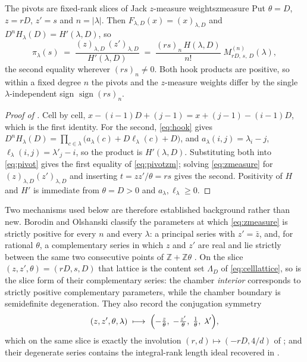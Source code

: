 \documentclass[11pt,letterpaper]{article}
\newcommand{\Zint}{\mathbb{Z}}
\begin{document}
\begin{proposition}{The pivots are fixed-rank slices of Jack \texorpdfstring{$z$}{z}-measure weights}{zmeasure}
Put $\theta=D$, $z=rD$, $z'=s$ and $n=|\lambda|$. Then
$F_{\lambda,D}(x)=(x)_{\lambda,D}$ and $D^{n}H_\lambda(D)=H'(\lambda,D)$, so
\begin{equation}
  \pi_\lambda(s)
  \;=\;\frac{(z)_{\lambda,D}\,(z')_{\lambda,D}}{H'(\lambda,D)}
  \;=\;\frac{(rs)_n\,H(\lambda,D)}{n!}\;M^{(n)}_{rD,\,s,\,D}(\lambda),
  \label{eq:pivotzm}
\end{equation}
the second equality wherever $(rs)_n\ne0$. Both hook products are positive, so
within a fixed degree $n$ the pivots and the $z$-measure weights differ by the
single $\lambda$-independent sign $\operatorname{sign}(rs)_n$.
\end{proposition}

\begin{proof}[Proof of ]
Cell by cell, $x-(i-1)D+(j-1)=x+(j-1)-(i-1)D$, which is the first identity. For
the second, \eqref{eq:hook} gives
$D^{n}H_\lambda(D)=\prod_{c\in\lambda}\bigl(a_\lambda(c)+D\ell_\lambda(c)+D\bigr)$,
and $a_\lambda(i,j)=\lambda_i-j$, $\ell_\lambda(i,j)=\lambda'_j-i$, so the
product is $H'(\lambda,D)$. Substituting both into \eqref{eq:pivot} gives the
first equality of \eqref{eq:pivotzm}; solving \eqref{eq:zmeasure} for
$(z)_{\lambda,D}(z')_{\lambda,D}$ and inserting $t=zz'/\theta=rs$ gives the
second. Positivity of $H$ and $H'$ is immediate from $\theta=D>0$ and
$a_\lambda,\ell_\lambda\ge0$.
\end{proof}

Two mechanisms used below are therefore established background rather than new.
Borodin and Olshanski classify the parameters at which \eqref{eq:zmeasure} is
strictly positive for every $n$ and every $\lambda$: a principal series with
$z'=\bar z$, and, for rational $\theta$, a complementary series in which $z$ and
$z'$ are real and lie strictly between the same two consecutive points of
$\Zint+\Zint\theta$ \cite[\S1]{BO}. On the slice $(z,z',\theta)=(rD,s,D)$ that
lattice is the content set $\Lambda_D$ of \eqref{eq:celllattice}, so
 is the slice form of their complementary series: the chamber
\emph{interior} corresponds to strictly positive complementary parameters, while
the chamber boundary is semidefinite degeneration. They also
record the conjugation symmetry
\begin{equation}
  (z,z',\theta,\lambda)\;\longmapsto\;
  \Bigl(-\tfrac z\theta,\;-\tfrac{z'}\theta,\;\tfrac1\theta,\;\lambda'\Bigr),
  \label{eq:BOtranspose}
\end{equation}
which on the same slice is exactly the involution $(r,d)\mapsto(-rD,4/d)$ of
; and their degenerate series contains the integral-rank
length ideal recovered in .
\end{document}
